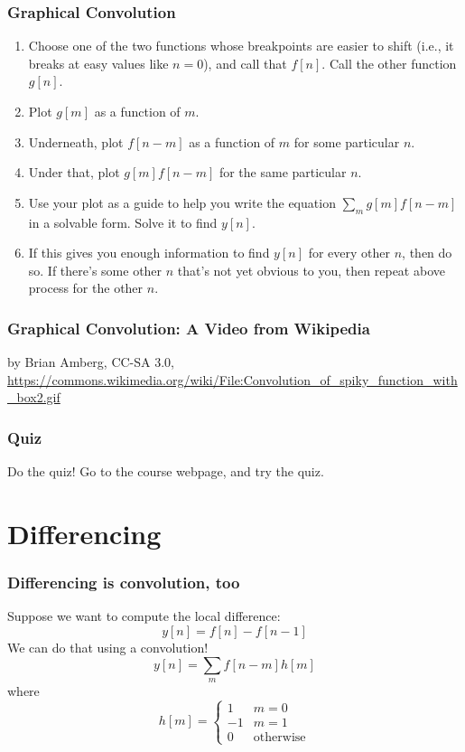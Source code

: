 \documentclass{beamer}
\begin{document}
\begin{frame}
  \frametitle{Graphical Convolution}

  \begin{enumerate}
  \item Choose one of the two functions whose breakpoints are easier to shift
    (i.e., it breaks at easy values like $n=0$), and call that $f[n]$.  Call the other
    function $g[n]$.
  \item Plot $g[m]$ as a function of $m$.
  \item Underneath, plot $f[n-m]$
    as a function of $m$ for some particular $n$.
  \item Under that, plot $g[m]f[n-m]$ for the same particular $n$.
  \item Use your plot as a guide to help you write the equation
    $\sum_m g[m]f[n-m]$ in a solvable form.  Solve it to find $y[n]$.
  \item If this gives you enough information to find $y[n]$ for every
    other $n$, then do so.  If there's some other $n$ that's not yet
    obvious to you, then repeat above process for the other $n$.
  \end{enumerate}
\end{frame}

\begin{frame}
  \frametitle{Graphical Convolution: A Video from Wikipedia}
  \begin{tiny}
    by Brian Amberg, CC-SA 3.0,
    \url{https://commons.wikimedia.org/wiki/File:Convolution_of_spiky_function_with_box2.gif}
  \end{tiny}
\end{frame}

\begin{frame}
  \frametitle{Quiz}

  Do the quiz!  Go to the course webpage, and try the quiz.
\end{frame}


\section[Differencing]{Differencing}
\setcounter{subsection}{1}

\begin{frame}
  \frametitle{Differencing is convolution, too}

  Suppose we want to compute the local difference:
  \[
  y[n] = f[n] - f[n-1]
  \]
  We can do that using a convolution!
  \[
  y[n] = \sum_m f[n-m]h[m]
  \]
  where
  \[
  h[m] = \begin{cases}
    1 & m=0\\
    -1 & m=1\\
    0 & \mbox{otherwise}
  \end{cases}
  \]
\end{frame}
\end{document}
